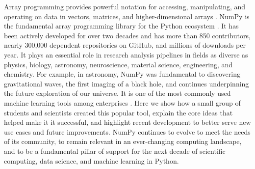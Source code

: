 




Array programming provides powerful notation for accessing,
manipulating, and operating on data in vectors, matrices, and
higher-dimensional arrays \cite{iverson1980notation}.
NumPy is the fundamental array programming library for the Python ecosystem
\cite{dubois2007guest,oliphant2007python,millman2011python,perez2011python}.
It has been actively developed for over two decades and has more than 850
contributors, nearly 300,000 dependent repositories on GitHub, and millions of
downloads per year.
It plays an essential role in research analysis pipelines in fields as
diverse as physics, biology, astronomy, neuroscience, material science,
engineering, and chemistry.
For example, in astronomy, NumPy was fundamental to discovering gravitational
waves\cite{pycbc}, the first imaging of a black hole\cite{eht-imaging}, and
continues underpinning the future exploration of our
universe\cite{jenness2018lsst}.
It is one of the most commonly used machine learning tools among
enterprises \cite{451report2018}.
Here we show how a small group of students and scientists created this
popular tool, explain the core ideas that helped make it it successful,
and highlight recent development to better serve new use cases
and future improvements.
NumPy continues to evolve to meet the needs of its community, to remain
relevant in an ever-changing computing landscape, and to be a fundamental
pillar of support for the next decade of scientific computing, data science,
and machine learning in Python.
